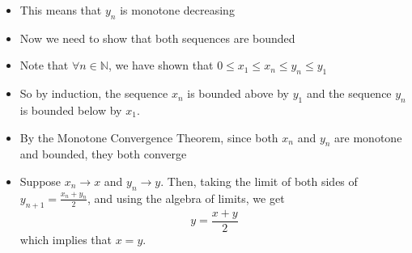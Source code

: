 \documentclass{article}
\begin{document}
\begin{itemize}
\begin{itemize}
\begin{itemize}
            \item This means that $y_n$ is monotone decreasing
            \item Now we need to show that both sequences are bounded
            \item Note that $\forall n \in \mathbb{N}$, we have shown that $0 \le x_1 \le x_n \le y_n \le y_1$
            \item So by induction, the sequence $x_n$ is bounded above by $y_1$ and the sequence $y_n$ is bounded below by $x_1$.
            \item By the Monotone Convergence Theorem, since both $x_n$ and $y_n$ are monotone and bounded, they both converge
            \item Suppose $x_n \rightarrow x$ and $y_n \rightarrow y$. Then, taking the limit of both sides of $y_{n+1} = \frac{x_n + y_n}{2}$, and using the algebra of limits, we get
            \[
            y = \frac{x+y}{2}
            \]
            which implies that $x=y$.
        \end{itemize}
    \end{itemize}
\end{itemize}
\end{document}
